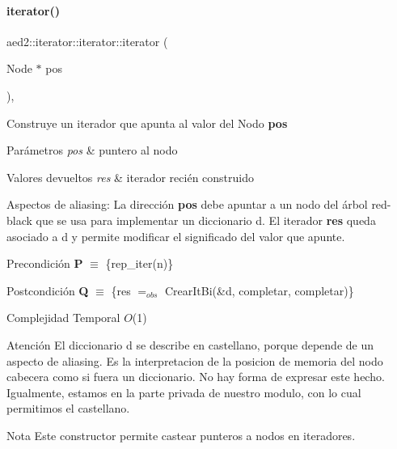 \paragraph{\texorpdfstring{iterator()}{iterator()}\hspace{0.1cm}{\footnotesize\ttfamily [2/2]}}
{\footnotesize\ttfamily aed2\+::iterator\+::iterator\+::iterator (\begin{DoxyParamCaption}\item[{Node $\ast$}]{pos }\end{DoxyParamCaption})\hspace{0.3cm}{\ttfamily [inline]}, {\ttfamily [private]}}



Construye un iterador que apunta al valor del Nodo {\bfseries pos} 


\begin{DoxyParams}{Parámetros}
{\em pos} & puntero al nodo \\
\hline
\end{DoxyParams}

\begin{DoxyRetVals}{Valores devueltos}
{\em res} & iterador recién construido\\
\hline
\end{DoxyRetVals}
\begin{DoxyParagraph}{Aspectos de aliasing\+:}
La dirección {\bfseries pos} debe apuntar a un nodo del árbol red-\/black que se usa para implementar un diccionario {\ttfamily d}. El iterador {\bfseries res} queda asociado a {\ttfamily d} y permite modificar el significado del valor que apunte.
\end{DoxyParagraph}
\begin{DoxyPrecond}{Precondición}
{\bfseries P} $\equiv$ \{rep\+\_\+iter(n)\} 
\end{DoxyPrecond}
\begin{DoxyPostcond}{Postcondición}
{\bfseries Q} $\equiv$ \{res $=_{obs}$ Crear\+It\+Bi(\&{\ttfamily d}, completar, completar)\}
\end{DoxyPostcond}

\begin{DoxyDescription}
\item[Complejidad Temporal]$O$(1)
\end{DoxyDescription}

\begin{DoxyAttention}{Atención}
El diccionario {\ttfamily d} se describe en castellano, porque depende de un aspecto de aliasing. Es la interpretacion de la posicion de memoria del nodo cabecera como si fuera un diccionario. No hay forma de expresar este hecho. Igualmente, estamos en la parte privada de nuestro modulo, con lo cual permitimos el castellano.
\end{DoxyAttention}
\begin{DoxyNote}{Nota}
Este constructor permite castear punteros a nodos en iteradores. 
\end{DoxyNote}


